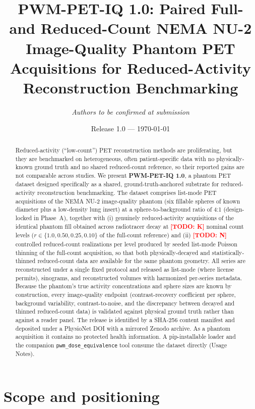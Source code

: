 \documentclass[twoside,11pt]{article}
\title{\textbf{PWM-PET-IQ 1.0: Paired Full- and Reduced-Count NEMA NU-2 Image-Quality Phantom PET Acquisitions for Reduced-Activity Reconstruction Benchmarking}}
\author[1,2]{\textit{Authors to be confirmed at submission}}
\affil[1]{University of Texas Southwestern Medical Center, Dallas, TX, USA}
\affil[2]{PWM Protocol Foundation}
\date{Release 1.0 --- \today}
\newcommand{\todo}[1]{\textcolor{red}{\textbf{[TODO: #1]}}}
\begin{document}
\maketitle

\begin{abstract}
\noindent Reduced-activity (``low-count'') PET reconstruction methods are
proliferating, but they are benchmarked on heterogeneous, often
patient-specific data with no physically-known ground truth and no shared
reduced-count reference, so their reported gains are not comparable across
studies. We present \textbf{PWM-PET-IQ 1.0}, a phantom PET dataset designed
specifically as a shared, ground-truth-anchored substrate for reduced-activity
reconstruction benchmarking. The dataset comprises list-mode PET acquisitions
of the NEMA NU-2 image-quality phantom (six fillable spheres of known diameter
plus a low-density lung insert) at a sphere-to-background ratio of
4:1 (design-locked in Phase~A), together with (i) genuinely reduced-activity acquisitions
of the identical phantom fill obtained across radiotracer decay at
\todo{K} nominal count levels ($r \in \{1.0, 0.50, 0.25, 0.10\}$ of the
full-count reference) and (ii) \todo{N} controlled reduced-count realizations
per level produced by seeded list-mode Poisson thinning of the full-count
acquisition, so that both physically-decayed and statistically-thinned
reduced-count data are available for the same phantom geometry. All series are
reconstructed under a single fixed protocol and released as list-mode (where
license permits), sinograms, and reconstructed volumes with harmonized
per-series metadata. Because the phantom's true activity concentrations and
sphere sizes are known by construction, every image-quality endpoint
(contrast-recovery coefficient per sphere, background variability, contrast-to-noise,
and the discrepancy between decayed and thinned reduced-count data) is validated
against physical ground truth rather than against a reader panel. The release is
identified by a SHA-256 content manifest and deposited under a PhysioNet DOI with
a mirrored Zenodo archive. As a phantom acquisition it contains no protected
health information. A pip-installable loader and the companion
\texttt{pwm\_dose\_equivalence} tool consume the dataset directly (Usage Notes).
\end{abstract}

\section*{Scope and positioning}
\end{document}
